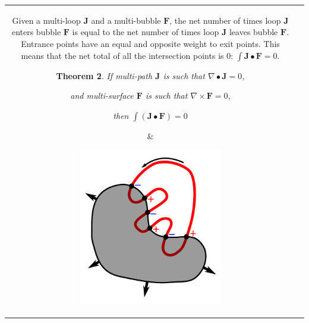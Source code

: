 \documentclass{book}
\newtheorem{thm}{Theorem}
\begin{document}
\begin{tabular}{cc}
\parbox{0.5\textwidth}{
Given a multi-loop \(\mathbf{J}\) and a multi-bubble \(\mathbf{F}\), the net number of times loop \(\mathbf{J}\) enters bubble \(\mathbf{F}\) is equal to the net number of times loop \(\mathbf{J}\) leaves bubble \(\mathbf{F}\). Entrance points have an equal and opposite weight to exit points. This means that the net total of all the intersection points is \(0\): \(\int \mathbf{J} \bullet \mathbf{F} = 0\). 

\begin{thm}
If multi-path \(\mathbf{J}\) is such that \(\nabla \bullet \mathbf{J} = 0\), 

and multi-surface \(\mathbf{F}\) is such that \(\nabla \times \mathbf{F} = 0\), 

then \(\int (\mathbf{J} \bullet \mathbf{F}) = 0\)
\end{thm}
} & \parbox{0.5\textwidth}{
\includegraphics[width = 0.5\textwidth]{Intersections/Path-surface_intersections/closed_surface_and_closed_path}
}
\end{tabular}
\end{document}
